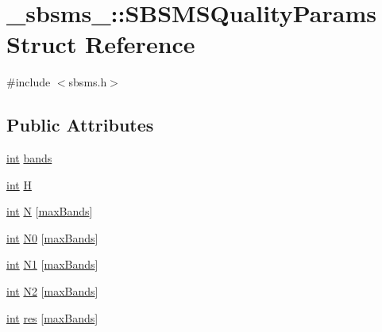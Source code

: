 \hypertarget{struct__sbsms___1_1_s_b_s_m_s_quality_params}{}\section{\+\_\+sbsms\+\_\+\+:\+:S\+B\+S\+M\+S\+Quality\+Params Struct Reference}
\label{struct__sbsms___1_1_s_b_s_m_s_quality_params}


{\ttfamily \#include $<$sbsms.\+h$>$}

\subsection*{Public Attributes}
\begin{DoxyCompactItemize}
\item 
\hyperlink{xmltok_8h_a5a0d4a5641ce434f1d23533f2b2e6653}{int} \hyperlink{struct__sbsms___1_1_s_b_s_m_s_quality_params_a12837690a45fa94b0534443d299d2f41}{bands}
\item 
\hyperlink{xmltok_8h_a5a0d4a5641ce434f1d23533f2b2e6653}{int} \hyperlink{struct__sbsms___1_1_s_b_s_m_s_quality_params_a709b40781a537fb4380463de5b469b67}{H}
\item 
\hyperlink{xmltok_8h_a5a0d4a5641ce434f1d23533f2b2e6653}{int} \hyperlink{struct__sbsms___1_1_s_b_s_m_s_quality_params_a6afd86d066a4a45f9898d3be9e659c16}{N} \mbox{[}\hyperlink{namespace__sbsms___aaa516460bd9d3c383bcfcb40a48a1927a94c27d17dd5dcbd2a58d6b9631e0b887}{max\+Bands}\mbox{]}
\item 
\hyperlink{xmltok_8h_a5a0d4a5641ce434f1d23533f2b2e6653}{int} \hyperlink{struct__sbsms___1_1_s_b_s_m_s_quality_params_a738b1587be2e5559c12a80c0a081a731}{N0} \mbox{[}\hyperlink{namespace__sbsms___aaa516460bd9d3c383bcfcb40a48a1927a94c27d17dd5dcbd2a58d6b9631e0b887}{max\+Bands}\mbox{]}
\item 
\hyperlink{xmltok_8h_a5a0d4a5641ce434f1d23533f2b2e6653}{int} \hyperlink{struct__sbsms___1_1_s_b_s_m_s_quality_params_aab33c781a432fc87d6f1b762ca9e2aff}{N1} \mbox{[}\hyperlink{namespace__sbsms___aaa516460bd9d3c383bcfcb40a48a1927a94c27d17dd5dcbd2a58d6b9631e0b887}{max\+Bands}\mbox{]}
\item 
\hyperlink{xmltok_8h_a5a0d4a5641ce434f1d23533f2b2e6653}{int} \hyperlink{struct__sbsms___1_1_s_b_s_m_s_quality_params_a1fd7199cccf829c490cbf88aba499e30}{N2} \mbox{[}\hyperlink{namespace__sbsms___aaa516460bd9d3c383bcfcb40a48a1927a94c27d17dd5dcbd2a58d6b9631e0b887}{max\+Bands}\mbox{]}
\item 
\hyperlink{xmltok_8h_a5a0d4a5641ce434f1d23533f2b2e6653}{int} \hyperlink{struct__sbsms___1_1_s_b_s_m_s_quality_params_a588c35d09633cc190deb59e960f6056b}{res} \mbox{[}\hyperlink{namespace__sbsms___aaa516460bd9d3c383bcfcb40a48a1927a94c27d17dd5dcbd2a58d6b9631e0b887}{max\+Bands}\mbox{]}
\end{DoxyCompactItemize}



